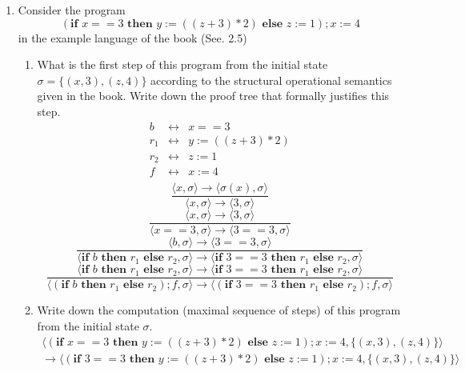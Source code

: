 \documentclass[12pt]{article}
\begin{document}
\begin{enumerate}
  \item Consider the program
    \[(\textbf{if } x == 3 \textbf{ then } y := ((z+3)*2) \textbf{ else } z := 1); x := 4 \]
    in the example language of the book (See. 2.5)
    \begin{enumerate}
    \item What is the first step of this program from the initial state $\sigma = \{(x,3),(z,4)\}$ according to the structural operational semantics given in the book. Write down the proof tree that formally justifies this step.
      \[
        \begin{array}{lll}
          b   & \longleftrightarrow & x==3 \\
          r_1 & \longleftrightarrow & y := ((z+3)*2) \\
          r_2 & \longleftrightarrow & z := 1 \\
          f   & \longleftrightarrow & x := 4 \\
        \end{array}
      \]
      \[
          \frac{ \langle x, \sigma \rangle \rightarrow \langle \sigma(x), \sigma \rangle }{ \langle x, \sigma \rangle \rightarrow \langle 3, \sigma \rangle }
      \]
      \[
          \frac{ \langle x, \sigma \rangle \rightarrow \langle 3, \sigma \rangle }{ \langle x==3, \sigma \rangle \rightarrow \langle 3 == 3, \sigma \rangle }
      \]
      \[
          \frac{ \langle b, \sigma \rangle \rightarrow \langle 3 == 3, \sigma \rangle }{
          \langle \textbf{if } b \textbf{ then } r_1 \textbf{ else } r_2, \sigma \rangle \rightarrow \langle \textbf{if } 3 == 3 \textbf{ then } r_1 \textbf{ else } r_2, \sigma \rangle
        }
      \]
      \[
          \frac{
          \langle \textbf{if } b \textbf{ then } r_1 \textbf{ else } r_2, \sigma \rangle \rightarrow \langle \textbf{if } 3 == 3 \textbf{ then } r_1 \textbf{ else } r_2, \sigma \rangle
          }{
          \langle (\textbf{if } b \textbf{ then } r_1 \textbf{ else } r_2); f, \sigma \rangle \rightarrow \langle (\textbf{if } 3 == 3 \textbf{ then } r_1 \textbf{ else } r_2); f, \sigma \rangle
          }
      \]
    \item Write down the computation (maximal sequence of steps) of this program from the initial state $\sigma$.
      \[
        \begin{array}{l}
          \langle (\textbf{if } x == 3 \textbf{ then } y := ((z+3)*2) \textbf{ else } z := 1); x := 4, \{(x,3),(z,4)\} \rangle\\
          \rightarrow \langle (\textbf{if } 3 == 3 \textbf{ then } y := ((z+3)*2) \textbf{ else } z := 1); x := 4, \{(x,3),(z,4)\} \rangle\\

\end{array}\]
\end{enumerate}
\end{enumerate}
\end{document}
